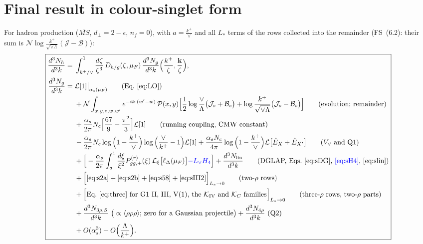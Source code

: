 \documentclass[10pt]{article}
\numberwithin{equation}{section}
\newcommand{\new}[1]{{\color{blue}#1}}
\newcommand{\Lv}{L_{\vee}}
\newcommand{\Ls}{L_{*}}
\newcommand{\KK}{\mathcal K}
\newcommand{\JJ}{\mathcal J}
\newcommand{\BB}{\mathcal B}
\newcommand{\NN}{\mathcal N}
\newcommand{\PP}{\mathcal P}
\newcommand{\LL}{\mathcal L}
\newcommand{\Eh}{\hat E}
\begin{document}
\section{Final result in colour-singlet form}\label{sec:final}
For hadron production ($\overline{MS}$, $d_\perp=2-\epsilon$, $n_f=0$), with $a=\frac{k^+}{\vee}$ and all $\Ls$ terms of the rows collected into the remainder (FS~(6.2): their sum is $\NN\log\frac{k^+}{\sqrt{\vee\Lambda}}(\JJ-\BB)$):
\begin{equation}
\boxed{\begin{aligned}
\frac{d^3N_h}{d^3k}={}&\int_{k^+/\vee}^1\frac{d\zeta}{\zeta^3}\,D_{h/g}(\zeta,\mu_F)\,\frac{d^3N_g}{d^3k}\Big(\frac{k^+}{\zeta},\frac{\mathbf k}{\zeta}\Big),\\
\frac{d^3N_g}{d^3k}={}&\LL[1]\big|_{\alpha_s(\mu_F)}\qquad\text{(Eq.~\eqref{eq:LO})}\\
&+\NN\int_{x,y,z,w,w'}e^{-ik\cdot(w'-w)}\,\PP(x,y)\Big[\frac12\log\frac{\vee}{\Lambda}\big(\JJ_s+\BB_s\big)+\log\frac{k^+}{\sqrt{\vee\Lambda}}\big(\JJ_s-\BB_s\big)\Big]\qquad\text{(evolution; remainder)}\\
&+\frac{\alpha_s}{2\pi}N_c\Big[\frac{67}{9}-\frac{\pi^2}{3}\Big]\LL[1]\qquad\text{(running coupling, CMW constant)}\\
&-\frac{\alpha_s}{2\pi}N_c\log\Big(1-\frac{k^+}{\vee}\Big)\log\Big(\frac{\vee}{k^+}-1\Big)\LL[1]
+\frac{\alpha_sN_c}{4\pi}\log\Big(1-\frac{k^+}{\vee}\Big)\LL\big[\Eh_X+\Eh_{X'}\big]\qquad\text{($V_\vee$ and Q1)}\\
&+\Big[-\frac{\alpha_s}{2\pi}\int_{a}^1\frac{d\xi}{\xi^2}P^{(r)}_{gg,+}(\xi)\,\LL_\xi\big[\ell_\Delta(\mu_F)\big]\new{-\Lv H_4}\Big]+\frac{d^3N_{\rm lin}}{d^3k}\qquad\text{(DGLAP, Eqs.~\eqref{eq:sDG}, \new{\eqref{eq:sH4}}, \eqref{eq:slin})}\\
&+\Big[\eqref{eq:s2a}+\eqref{eq:s2b}+\eqref{eq:s58}+\eqref{eq:sIII2}\Big]_{\Ls\to0}\qquad\text{(two-$\rho$ rows)}\\
&+\Big[\text{Eq.~\eqref{eq:three} for G1 II, III, V(1), the $\KK_{\rm IV}$ and $\KK_C$ families}\Big]_{\Ls\to0}\qquad\text{(three-$\rho$ rows, two-$\rho$ parts)}\\
&+\frac{d^3N_{3\rho,S}}{d^3k}\ \big(\propto\langle\rho\rho\rho\rangle\text{; zero for a Gaussian projectile}\big)+\frac{d^3N_{4\rho}}{d^3k}\ \text{(Q2)}\\
&+O(\alpha_s^3)+O\Big(\frac{\Lambda}{k^+}\Big).
\end{aligned}}
\label{eq:final}
\end{equation}
\end{document}
